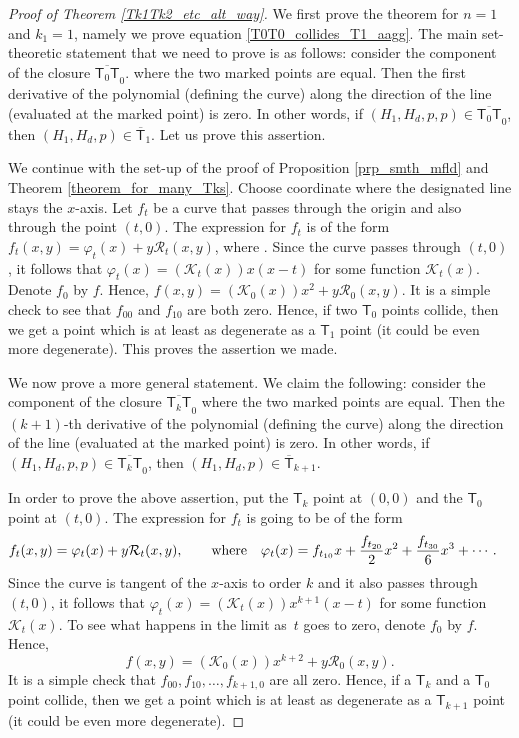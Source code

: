 \begin{proof}[Proof of Theorem \ref{Tk1Tk2_etc_alt_way}]
We first prove the theorem for $n = 1$ and $k_1 = 1$, namely
we prove equation \eqref{T0T0_collides_T1_aagg}.
The main set-theoretic statement that we need to prove is as follows:
consider the component of the closure $\overline{\mathsf{T}_0 \mathsf{T}}_0$.
where the two marked points are equal. Then the first derivative of the
polynomial (defining the curve) along the direction of the line
(evaluated at the marked point) is zero. In other words, if
$(H_1, H_d, p, p) \in \overline{\mathsf{T}_0 \mathsf{T}}_0$, then
$(H_1, H_d, p) \in \overline{\mathsf{T}}_1$. Let us prove this assertion.

We continue with the set-up of the proof of Proposition \ref{prp_smth_mfld}
and Theorem \ref{theorem_for_many_Tks}.
Choose coordinate where the designated line stays the $x$-axis.
Let $f_t$ be a curve that passes through the origin and also through the point $(t, 0)$.
The expression for $f_t$ is of the form
$
f_t(x, y)  =  \varphi_t(x)+ y \mathcal{R}_t(x, y)$,
where .
Since the curve passes through $(t, 0)$, it follows that
$
\varphi_{t}(x)  =  (\mathcal{K}_t(x))x(x-t)
$
for some function $\mathcal{K}_t(x)$. Denote $f_0$ by $f$. Hence,
$
f(x, y) =  (\mathcal{K}_0(x))x^2 + y \mathcal{R}_0(x, y)$.
It is a simple check to see that $f_{00}$ and $f_{10}$ are both zero.
Hence, if two $\mathsf{T}_0$ points collide, then we get a point which is at least as degenerate as a
$\mathsf{T}_1$ point (it could be even more degenerate). This proves the
assertion we made.

We now prove a more general statement.
We claim the following:
consider the component of the closure $\overline{\mathsf{T}_{k} \mathsf{T}}_0$
where the two marked points are equal. Then the $(k+1)$-th derivative of the
polynomial (defining the curve) along the direction of the line
(evaluated at the marked point) is zero. In other words, if
$(H_1, H_d, p, p) \in \overline{\mathsf{T}_{k} \mathsf{T}}_0$, then
$(H_1, H_d, p) \in \overline{\mathsf{T}}_{k+1}$.

In order to prove the above assertion, put the
$\mathsf{T}_k$ point at $(0, 0)$ and the $\mathsf{T}_0$ point at $(t, 0)$.
The expression for $f_t$ is going to be of the form
\begin{align*}
f_t(x, y)& = \varphi_t(x)+ y \mathcal{R}_t(x, y),\qquad
\textnormal{where} \quad \varphi_{t}(x) =  f_{t_{10}} x + \frac{f_{t_{20}}}{2} x^2 + \frac{f_{t_{30}}}{6} x^3 + \cdots .
\end{align*}
Since the curve is tangent of the $x$-axis to order $k$ and it also passes through $(t, 0)$,
it follows that
$
\varphi_{t}(x)  =  (\mathcal{K}_t(x))x^{k+1}(x-t)
$
for some function $\mathcal{K}_t(x)$. To see what happens in the limit as~$t$ goes to zero, denote $f_0$ by $f$.
Hence,
\[
f(x, y) =  (\mathcal{K}_0(x))x^{k+2} + y \mathcal{R}_0(x, y).
\]
It is a simple check that $f_{00}, f_{10}, \dots, f_{k+1, 0}$ are all zero.
Hence, if a $\mathsf{T}_k$ and a $\mathsf{T}_0$ point collide, then
we get a point which is at least as degenerate as a $\mathsf{T}_{k+1}$ point (it could be even more degenerate).


\end{proof}
